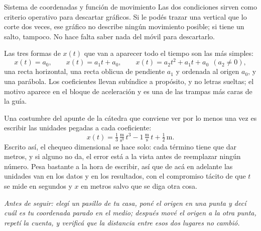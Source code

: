 \documentclass[11pt,openany]{book}
\begin{document}
\begin{bloque}{Sistema de coordenadas y función de movimiento}
Las dos condiciones sirven como criterio operativo para descartar gráficos. Si le podés trazar una vertical que lo corte dos veces, ese gráfico no describe ningún movimiento posible; si tiene un salto, tampoco. No hace falta saber nada del móvil para descartarlo.

Las tres formas de $x(t)$ que van a aparecer todo el tiempo son las más simples:
\[
x(t) = a_0, \qquad x(t) = a_1 t + a_0, \qquad x(t) = a_2t^2 + a_1t + a_0 \ \ (a_2\neq 0),
\]
una recta horizontal, una recta oblicua de pendiente $a_1$ y ordenada al origen $a_0$, y una parábola. Los coeficientes llevan subíndice a propósito, y no letras sueltas; el motivo aparece en el bloque de aceleración y es una de las trampas más caras de la guía.

Una costumbre del apunte de la cátedra que conviene ver por lo menos una vez es escribir las unidades pegadas a cada coeficiente:
\[
x(t) = \tfrac13\,\tfrac{\mathrm{m}}{\mathrm{s^3}}\,t^3 - 1\,\tfrac{\mathrm{m}}{\mathrm{s}}\,t + \tfrac12\,\mathrm{m}.
\]
Escrito así, el chequeo dimensional se hace solo: cada término tiene que dar metros, y si alguno no da, el error está a la vista antes de reemplazar ningún número. Pesa bastante a la hora de escribir, así que de acá en adelante las unidades van en los datos y en los resultados, con el compromiso tácito de que $t$ se mide en segundos y $x$ en metros salvo que se diga otra cosa.

\begin{center}
\end{center}

\textit{Antes de seguir: elegí un pasillo de tu casa, poné el origen en una punta y decí cuál es tu coordenada parado en el medio; después mové el origen a la otra punta, repetí la cuenta, y verificá que la distancia entre esos dos lugares no cambió.}
\end{bloque}
\end{document}
